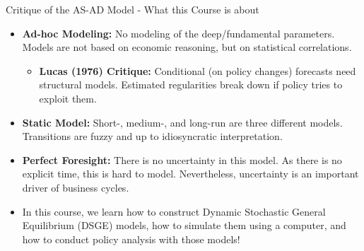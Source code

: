 \documentclass[10pt,c,aspectratio=1610,handout]{beamer}
\begin{document}
\begin{frame}{Critique of the AS-AD Model - What this Course is about}%
  \begin{itemize}%
    \item[$\blacktriangleright$] \textbf{Ad-hoc Modeling:} No modeling of the deep/fundamental parameters. Models are not based on economic reasoning, but on statistical correlations.%
    \begin{itemize}%
      \item[$\rightarrow$] \textbf{Lucas (1976) Critique:} Conditional (on policy changes) forecasts need structural models. Estimated regularities break down if policy tries to exploit them.%
    \end{itemize}%
    \pause%
    \item[$\blacktriangleright$] \textbf{Static Model:} Short-, medium-, and long-run are three different models. Transitions are fuzzy and up to idiosyncratic interpretation.%
    \pause%
    \item[$\blacktriangleright$] \textbf{Perfect Foresight:} There is no uncertainty in this model. As there is no explicit time, this is hard to model. Nevertheless, uncertainty is an important driver of business cycles.%
    \vspace{0.1in}%
    \pause%
    \item[$\Rightarrow$] In this course, we learn how to construct Dynamic Stochastic General Equilibrium (DSGE) models, how to simulate them using a computer, and how to conduct policy analysis with those models!%
  \end{itemize}%
\end{frame}%
\end{document}
